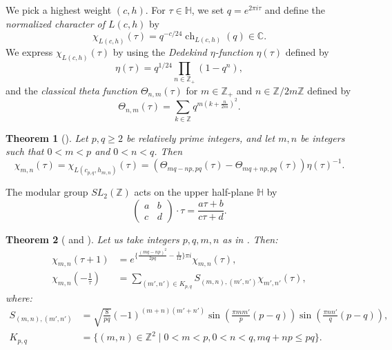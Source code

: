 \documentclass[a4paper, 12pt, reqno]{amsart}
\newtheorem{theorem}{Theorem}[section]
\theoremstyle{remark}
\DeclareMathOperator{\ch}{ch}
\begin{document}
We pick a highest weight $(c, h)$.
For $\tau \in \mathbb{H}$, we set $q = e^{2\pi i\tau}$ and define the \emph{normalized character of $L(c, h)$} by
\begin{equation*}
  \chi_{L(c, h)}(\tau) = q^{-c/24}\ch_{L(c, h)}(q) \in \mathbb{C}.
\end{equation*}
We express $\chi_{L(c, h)}(\tau)$ by using the \emph{Dedekind $\eta$-function} $\eta(\tau)$ defined by
\begin{equation*}
  \eta(\tau) = q^{1/24}\prod_{n \in \mathbb{Z}_+}(1 - q^n),
\end{equation*}
and the \emph{classical theta function $\Theta_{n, m}(\tau)$} for $m \in \mathbb{Z}_+$ and $n \in \mathbb{Z}/2m\mathbb{Z}$ defined by
\begin{equation*}
  \Theta_{n, m}(\tau) = \sum_{k \in \mathbb{Z}}q^{m(k + \frac{n}{2m})^2}.
\end{equation*}

\begin{theorem}[{\cite[Corollary 6.1]{iohara_representation_2011}}]
  \label{thr:47}
  Let $p, q \ge 2$ be relatively prime integers, and let $m, n$ be integers such that $0 < m < p$ and $0 < n < q$.
  Then
  \begin{equation*}
    \chi_{m, n}(\tau) = \chi_{L(c_{p, q}, h_{m, n})}(\tau) = (\Theta_{mq - np, pq}(\tau) - \Theta_{mq + np, pq}(\tau))\eta(\tau)^{-1}.
  \end{equation*}
\end{theorem}

The modular group $SL_2(\mathbb{Z})$ acts on the upper half-plane $\mathbb{H}$ by
\begin{equation*}
  \begin{pmatrix}
    a & b \\ c & d
  \end{pmatrix}
  \cdot \tau = \frac{a\tau + b}{c\tau + d}.
\end{equation*}

\begin{theorem}[{\cite[Proposition 6.3]{iohara_representation_2011}} and {\cite{zhu_modular_1996}}]
  \label{thr:48}
  Let us take integers $p, q, m, n$ as in .
  Then:
  \begin{align*}
    \chi_{m, n}(\tau + 1) &= e^{\{\frac{(mq - np)^2}{2pq} - \frac{1}{12}\}\pi i}\chi_{m, n}(\tau), \\
    \chi_{m, n}\left(-\frac{1}{\tau}\right) &= \sum_{(m', n') \in K_{p, q}}S_{(m, n), (m', n')}\chi_{m', n'}(\tau),
  \end{align*}
  where:
  \begin{align*}
    S_{(m, n), (m', n')} &= \sqrt{\frac{8}{pq}}(-1)^{(m + n)(m' + n')}\sin\left(\frac{\pi mm'}{p}(p - q)\right)\sin\left(\frac{\pi nn'}{q}(p - q)\right), \\
    K_{p, q} &= \{(m, n) \in \mathbb{Z}^2 \mid 0 < m < p, 0 < n < q, mq + np \le pq\}.
  \end{align*}
\end{theorem}
\end{document}

